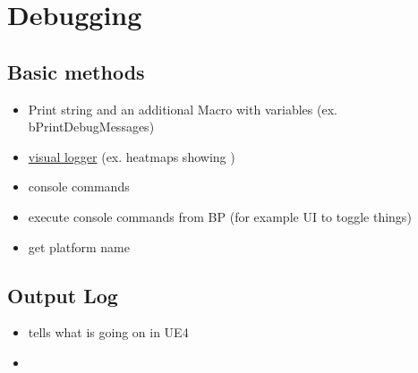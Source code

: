 \documentclass{scrbook}
\begin{document}
    \chapter{Debugging}


        \section{Basic methods}
            \begin{itemize}
                \item Print string and an additional Macro with variables (ex. bPrintDebugMessages)
                \item \hyperref[sec:visuallogger]{visual logger} (ex. heatmaps showing )
                \item console commands
                \item execute console commands from BP (for example UI to toggle things)
                \item get platform name
            \end{itemize}
        

        \section{Output Log}
            \begin{itemize}
                \item tells what is going on in UE4
                \item 
            \end{itemize}
\end{document}
